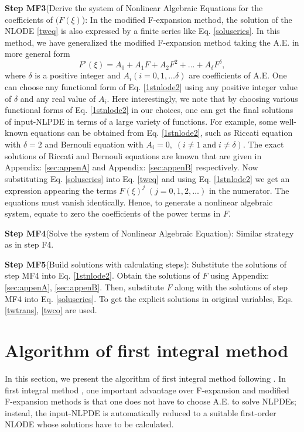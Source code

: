 \documentclass[prd,aps,floats,showkeys,nofootinbib,notitlepage]{revtex4-2}
\begin{document}
	\textbf{Step MF3}(Derive the system of Nonlinear Algebraic Equations for the coefficients of $(F(\xi)$):
	In the modified F-expansion method, the solution of the NLODE \eqref{tweq} is also expressed by a finite series like Eq. \eqref{soluseries}. In this method, we have generalized the modified F-expansion method \cite{modfexpn} taking the A.E. in more general form
	\begin{equation}\label{1stnlode2}
		F'\left( \xi  \right) = {A_0} + {A_1}F + {A_2}{F^2} +  \ldots + {A_\delta }{F^\delta },
	\end{equation}
	where $\delta$ is a positive integer and $A_i(i=0,1,\ldots \delta)$ are coefficients of A.E. One can choose any functional form of Eq. \eqref{1stnlode2} using any positive integer value of $\delta$ and any real value of $A_i$. Here interestingly, we note that by choosing various functional forms of Eq. \eqref{1stnlode2} in our choices, one can get the final solutions of input-NLPDE in terms of a large variety of functions. For example, some well-known equations can be obtained from Eq. \eqref{1stnlode2}, such as Riccati equation with $\delta=2$ and Bernouli equation with $A_i=0,\;(i\ne 1\; \text{and}\; i \ne \delta)$. The exact solutions of Riccati and Bernouli equations are known that are given in Appendix: \ref{sec:appenA} and Appendix: \ref{sec:appenB} respectively.
	Now substituting Eq. \eqref{soluseries} into Eq. \eqref{tweq} and using Eq. \eqref{1stnlode2} we get an expression appearing the terms $F(\xi)^j\;(j=0,1,2,\ldots)$ in the numerator. The equations must vanish identically. Hence, to generate a nonlinear algebraic system, equate to zero the coefficients of the power terms in $F$.
	
	\textbf{Step MF4}(Solve the system of Nonlinear Algebraic Equation): Similar strategy as in step F4.
	
	\textbf{Step MF5}(Build solutions with calculating steps): Substitute the solutions of step MF4 into Eq. \eqref{1stnlode2}. Obtain the solutions of $F$ using Appendix: \ref{sec:appenA}, \ref{sec:appenB}. Then, substitute $F$ along with the solutions of step MF4 into Eq. \eqref{soluseries}. To get the explicit solutions in original variables, Eqs. \eqref{twtrans}, \eqref{twco} are used.
	
	
	\section{Algorithm of first integral method}\label{sec:fim}
	In this section, we present the algorithm of first integral method following \cite{fim0,fim,mirza,complexTwt1}.
	In first integral method \cite{fim0,fim,mirza,complexTwt1}, one important advantage over F-expansion and modified F-expansion methods is that one does not have to choose A.E. to solve NLPDEs; instead, the input-NLPDE is automatically reduced to a suitable first-order NLODE whose solutions have to be calculated.  
	
\end{document}
